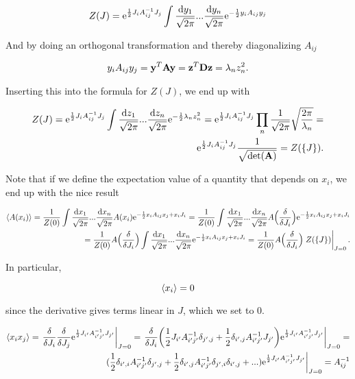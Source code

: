 \begin{equation}
    Z(J) = \mathrm{e}^{\frac{1}{2}J_{i}A_{ij}^{-1}J_{j}} \int \frac{\mathrm{d}y_{1}}{\sqrt{2\pi}} ... \frac{\mathrm{d}y_{n}}{\sqrt{2\pi}}   \mathrm{e}^{-\frac{1}{2}y_{i} A_{ij} y_{j}}
\end{equation}

And by doing an orthogonal transformation and thereby diagonalizing $A_{ij}$

\begin{align*}
    y_{i}A_{ij}y_{j} = \vb{y}^{T}\vb{
    A}\vb{y} = \vb{z}^{T}\vb{D}\vb{z} = \lambda_{n}z_{n}^{2}.
\end{align*}

Inserting this into the formula for $Z(J)$, we end up with

\begin{align*}
    Z(J) = \mathrm{e}^{\frac{1}{2}J_{i}A_{ij}^{-1}J_{j}} \int \frac{\mathrm{d}z_{1}}{\sqrt{2\pi}} ... \frac{\mathrm{d}z_{n}}{\sqrt{2\pi}}   \mathrm{e}^{-\frac{1}{2}\lambda_{n}z_{n}^{2}} = \mathrm{e}^{\frac{1}{2}J_{i}A_{ij}^{-1}J_{j}} \prod_{n} \frac{1}{\sqrt{2\pi}} \sqrt{\frac{2\pi}{\lambda_{n}}} = \\ \mathrm{e}^{\frac{1}{2}J_{i}A_{ij}^{-1}J_{j}} \frac{1}{\sqrt{\det(\vb{A})}} = Z(\{J\}).
\end{align*}

Note that if we define the expectation value of a quantity that depends on $x_{i}$, we end up with the nice result 

\begin{align*}
    \expval{A(x_{i})} = \frac{1}{Z(0)}\int \frac{\dx_{1}}{\sqrt{2\pi}} ... \frac{\dx_{n}}{\sqrt{2\pi}} A(x_{i})  \e^{-\frac{1}{2}x_{i} A_{ij} x_{j}  + x_{i} J_{i}} = \frac{1}{Z(0)} \int \frac{\dx_{1}}{\sqrt{2\pi}} ... \frac{\dx_{n}}{\sqrt{2\pi}} A\Big(\fdv{J_{i}}\Big)  \e^{-\frac{1}{2}x_{i} A_{ij} x_{j}  + x_{i} J_{i}} \\ = \frac{1}{Z(0)} A\Big(\fdv{J_{i}}\Big) \int \frac{\dx_{1}}{\sqrt{2\pi}} ... \frac{\dx_{n}}{\sqrt{2\pi}}  \e^{-\frac{1}{2}x_{i} A_{ij} x_{j}  + x_{i} J_{i}} = \frac{1}{Z(0)} A\Big(\fdv{J_{i}}\Big) \eval{Z(\{J\})}_{J = 0}.
\end{align*}

In particular,

\begin{equation*}
    \expval{x_i} = 0
\end{equation*}

since the derivative gives terms linear in $J$, which we set to $0$. 

\begin{align*}
    \expval{x_{i}x_{j}} = \eval{\fdv{J_{i}}\fdv{J_{j}} \e^{\frac{1}{2}J_{i'}A_{i'j'}^{-1}J_{j'}}}_{J = 0} = \eval{\fdv{J_{i}}(\frac{1}{2}J_{i'}A_{i'j'}^{-1}\delta_{j', j} + \frac{1}{2}\delta_{i', j}A_{i'j'}^{-1}J_{j'})\e^{\frac{1}{2}J_{i'}A_{i'j'}^{-1}J_{j'}}}_{J = 0} = \\ \eval{(\frac{1}{2}\delta_{i', i}A_{i'j'}^{-1}\delta_{j', j} + \frac{1}{2}\delta_{i', j}A_{i'j'}^{-1}\delta_{j', i} \delta_{i', j} + ... )\e^{\frac{1}{2}J_{i'}A_{i'j'}^{-1}J_{j'}}}_{J = 0} = A_{ij}^{-1} 
\end{align*}

